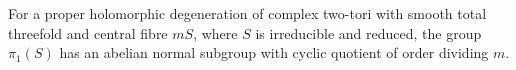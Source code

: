 
\begin{proposition}[P4R.1]\hypertarget{tag-02Y2}{}\label{night:P4R.1}\label{stmt:P4R.1}


For a proper holomorphic degeneration of complex two-tori with
smooth total threefold and central fibre $mS$, where $S$ is
irreducible and reduced, the group $\pi_1(S)$ has an abelian
normal subgroup with cyclic quotient of order dividing $m$.
\end{proposition}

